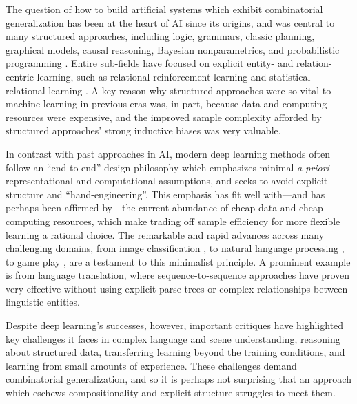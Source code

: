 The question of how to build artificial systems which exhibit combinatorial generalization has been at the heart of AI since its origins, and was central to many structured approaches, including logic, grammars, classic planning, graphical models, causal reasoning, Bayesian nonparametrics, and probabilistic programming \citep{chomsky1957syntactic,nilsson1970strips,pearl1986fusion,pearl2000causality,russell2016artificial,hjort2010bayesian,goodman2012church,ghahramani2015probabilistic}.
Entire sub-fields have focused on explicit entity- and relation-centric learning, such as relational reinforcement learning \citep{dvzeroski2001relational} and statistical relational learning \citep{getoor2007introduction}. A key reason why structured approaches were so vital to machine learning in previous eras was, in part, because data and computing resources were expensive, and the improved sample complexity afforded by structured approaches' strong inductive biases was very valuable.

In contrast with past approaches in AI, modern deep learning methods \citep{lecun2015deep,schmidhuber2015deep,goodfellow2016deep} often follow an ``end-to-end'' design philosophy which emphasizes minimal \emph{a priori} representational and computational assumptions, and seeks to avoid explicit structure and ``hand-engineering''.
%
This emphasis has fit well with---and has perhaps been affirmed by---the current abundance of cheap data and cheap computing resources, which make trading off sample efficiency for more flexible learning a rational choice.
The remarkable and rapid advances across many challenging domains, from image classification \citep{krizhevsky2012imagenet,szegedy2017inception}, to natural language processing \citep{sutskever2014sequence,bahdanau2014neural}, to game play \citep{mnih2015human,silver2016mastering,moravvcik2017deepstack}, are a testament to this minimalist principle. A prominent example is from language translation, where sequence-to-sequence approaches \citep{sutskever2014sequence,bahdanau2014neural} have proven very effective without using explicit parse trees or complex relationships between linguistic entities.

Despite deep learning's successes, however, important critiques 
\citep{marcus2001algebraic,shalev2017failures,lake2017building,lake2018still,marcus2018deep,marcus2018innateness,pearl2018theoretical,yuille2018deep} 
have highlighted key challenges it faces in complex language and scene understanding, reasoning about structured data, transferring learning beyond the training conditions, and learning from small amounts of experience.
These challenges demand combinatorial generalization, and so it is perhaps not surprising that an approach which eschews compositionality and explicit structure struggles to meet them.

